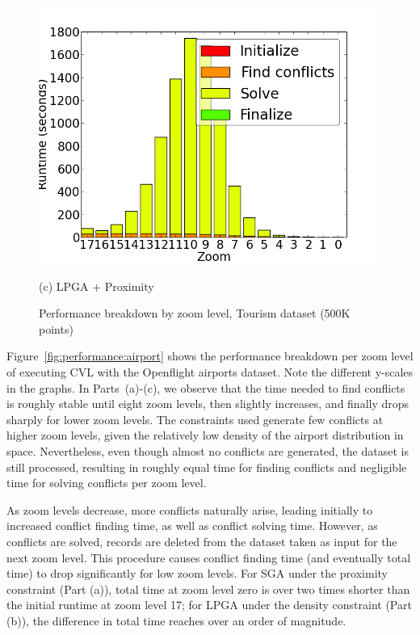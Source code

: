 \begin{figure}[tb]
\begin{minipage}{0.329\linewidth}
    \centerline{\includegraphics[width=1.0\linewidth]{./figs/prelim_pnt_500k_tourism_lp_B.png}}
    \centerline{(c) LPGA + Proximity}
  \end{minipage}
  \vspace{-0ex}
  \caption{Performance breakdown by zoom level, Tourism dataset (500K points)} \label{fig:performance:tourism}
  \vspace{-2ex}
\end{figure}


 Figure~\ref{fig:performance:airport} shows the performance breakdown per zoom level of executing CVL with the Openflight airports dataset. Note the different y-scales in the graphs. In Parts~(a)-(c), we observe that the time needed to find conflicts is roughly stable until eight zoom levels, then slightly increases, and finally drops sharply for lower zoom levels. The constraints used generate few conflicts at higher zoom levels, given the relatively low density of the airport distribution in space. Nevertheless, even though almost no conflicts are generated, the dataset is still processed, resulting in roughly equal time for finding conflicts and negligible time for solving conflicts per zoom level. 
 
As zoom levels decrease, more conflicts naturally arise, leading initially to increased conflict finding time, as well as conflict solving time. However, as conflicts are solved, records are deleted from the dataset taken as input for the next zoom level. This procedure causes conflict finding time (and eventually total time) to drop significantly for low zoom levels. For SGA under the proximity constraint (Part (a)), total time at zoom level zero is over two times shorter than the initial runtime at zoom level 17; for LPGA under the density constraint (Part (b)), the difference in total time reaches over an order of magnitude.  

